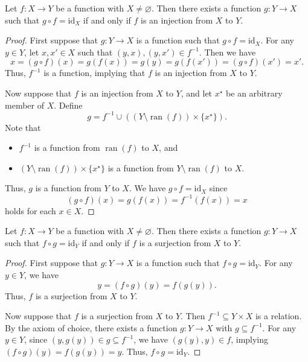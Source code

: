 \documentclass[11pt]{article}
\DeclareMathOperator{\ran}{ran}
\newcommand{\id}{\mathrm{id}}
\begin{document}
\begin{theorem}
  Let $f: X \to Y$ be a function with $X \neq \varnothing$.
  Then there exists a function $g: Y \to X$ such that $g \circ f = \id_X$ if and only if $f$ is an injection from $X$ to $Y$.
\end{theorem}
\begin{proof}
  First suppose that $g: Y \to X$ is a function such that $g \circ f = \id_X$.
  For any $y \in Y$, let $x, x' \in X$ such that $(y, x), (y, x') \in f^{-1}$.
  Then we have
  \begin{equation*}
    x = (g \circ f)(x) = g(f(x)) = g(y) = g(f(x')) = (g \circ f)(x') = x'.
  \end{equation*}
  Thus, $f^{-1}$ is a function, implying that $f$ is an injection from $X$ to $Y$.
  \par Now suppose that $f$ is an injection from $X$ to $Y$, and let $x^\star$ be an arbitrary member of $X$.
  Define
  \begin{equation*}
    g = f^{-1} \cup ((Y \setminus \ran(f)) \times \{x^\star\}).
  \end{equation*}
  Note that
  \begin{itemize}
    \item $f^{-1}$ is a function from $\ran(f)$ to $X$, and
    \item $(Y \setminus \ran(f)) \times \{x^\star\}$ is a function from $Y \setminus \ran(f)$ to $X$.
  \end{itemize}
  Thus, $g$ is a function from $Y$ to $X$.
  We have $g \circ f = \id_X$ since
  \begin{equation*}
    (g \circ f)(x) = g(f(x)) = f^{-1}(f(x)) = x
  \end{equation*}
  holds for each $x \in X$.
\end{proof}

\begin{theorem}
  Let $f: X \to Y$ be a function with $X \neq \varnothing$.
  Then there exists a function $g: Y \to X$ such that $f \circ g = \id_Y$ if and only if $f$ is a surjection from $X$ to $Y$.
\end{theorem}
\begin{proof}
  First suppose that $g: Y \to X$ is a function such that $f \circ g = \id_Y$.
  For any $y \in Y$, we have
  \begin{equation*}
    y = (f \circ g)(y) = f(g(y)).
  \end{equation*}
  Thus, $f$ is a surjection from $X$ to $Y$.
  \par Now suppose that $f$ is a surjection from $X$ to $Y$.
  Then $f^{-1} \subseteq Y \times X$ is a relation.
  By the axiom of choice, there exists a function $g: Y \to X$ with $g \subseteq f^{-1}$.
  For any $y \in Y$, since $(y, g(y)) \in g \subseteq f^{-1}$, we have $(g(y), y) \in f$, implying $(f \circ g)(y) = f(g(y)) = y$.
  Thus, $f \circ g = \id_Y$.
\end{proof}
\end{document}
